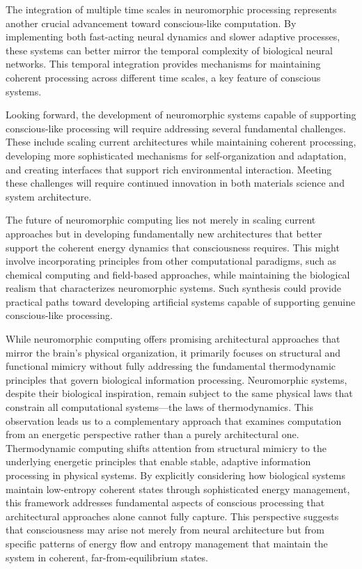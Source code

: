 The integration of multiple time scales in neuromorphic processing represents another crucial advancement toward conscious-like computation. By implementing both fast-acting neural dynamics and slower adaptive processes, these systems can better mirror the temporal complexity of biological neural networks. This temporal integration provides mechanisms for maintaining coherent processing across different time scales, a key feature of conscious systems.

Looking forward, the development of neuromorphic systems capable of supporting conscious-like processing will require addressing several fundamental challenges. These include scaling current architectures while maintaining coherent processing, developing more sophisticated mechanisms for self-organization and adaptation, and creating interfaces that support rich environmental interaction. Meeting these challenges will require continued innovation in both materials science and system architecture.

The future of neuromorphic computing lies not merely in scaling current approaches but in developing fundamentally new architectures that better support the coherent energy dynamics that consciousness requires. This might involve incorporating principles from other computational paradigms, such as~ chemical computing and field-based approaches, while maintaining the biological realism that characterizes neuromorphic systems. Such synthesis could provide practical paths toward developing artificial systems capable of supporting genuine conscious-like processing.

While neuromorphic computing offers promising architectural approaches that mirror the brain's physical organization, it primarily focuses on structural and functional mimicry without fully addressing the fundamental thermodynamic principles that govern biological information processing. Neuromorphic systems, despite their biological inspiration, remain subject to the same physical laws that constrain all computational systems—the laws of thermodynamics. This observation leads us to a complementary approach that examines computation from an energetic perspective rather than a purely architectural one.~ Thermodynamic computing shifts attention from structural mimicry to the underlying energetic principles that enable stable, adaptive information processing in physical systems. By explicitly considering how biological systems maintain low-entropy coherent states through sophisticated energy management, this framework addresses fundamental aspects of conscious processing that architectural approaches alone cannot fully capture. This perspective suggests that consciousness may arise not merely from neural architecture but from specific patterns of energy flow and entropy management that maintain the system in coherent, far-from-equilibrium states.
